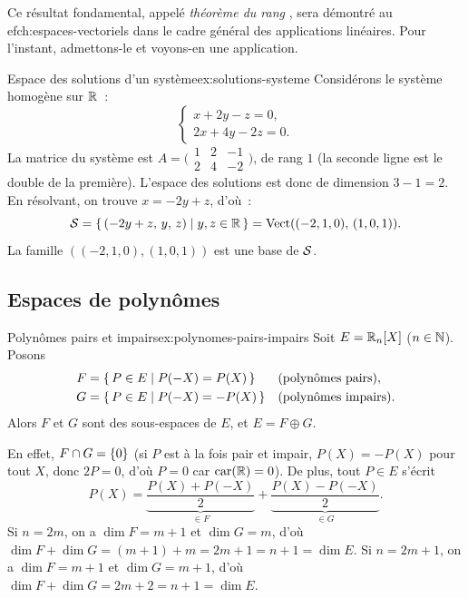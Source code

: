 Ce résultat fondamental, appelé \emph{théorème du rang}%
, sera démontré au 
ef{ch:espaces-vectoriels}
dans le cadre général des applications linéaires. Pour l'instant,
admettons-le et voyons-en une application.

\begin{example}{Espace des solutions d'un système}{ex:solutions-systeme}
  Considérons le système homogène sur ${\mathbb{R}}$~:
  \[
    \begin{cases}
      x+2y-z=0,\\
      2x+4y-2z=0.
    \end{cases}
  \]
  La matrice du système est
  $A=\bigl(\begin{smallmatrix}1&2&-1\\2&4&-2\end{smallmatrix}\bigr)$,
  de rang $1$ (la seconde ligne est le double de la première). L'espace
  des solutions est donc de dimension $3-1=2$. En résolvant, on trouve
  $x=-2y+z$, d'où~:
  \[
    {\mathcal{S}} = \left\{\,(-2y+z,\,y,\,z)\;\middle|\;y,z\in{\mathbb{R}}\,\right\}
    = \operatorname{Vect}((-2,1,0),\,(1,0,1)).
  \]
  La famille $((-2,1,0),(1,0,1))$ est une base de ${\mathcal{S}}$.
\end{example}

\subsection{Espaces de polynômes}\label{subsec:ev-polynomes}

\begin{example}{Polynômes pairs et impairs}{ex:polynomes-pairs-impairs}
  Soit $E={\mathbb{R}}_n[X]$ ($n\in{\mathbb{N}}$). Posons
  \begin{align*}
    F &= \left\{\,P\in E\;\middle|\;P(-X)=P(X)\,\right\} &&\text{(polynômes pairs)}, \\
    G &= \left\{\,P\in E\;\middle|\;P(-X)=-P(X)\,\right\} &&\text{(polynômes impairs)}.
  \end{align*}
  Alors $F$ et $G$ sont des sous-espaces de $E$, et $E=F\oplus G$.

  En effet, $F\cap G=\left\{0\right\}$ (si $P$ est à la fois pair et impair,
  $P(X)=-P(X)$ pour tout $X$, donc $2P=0$, d'où $P=0$ car
  $\operatorname{car}({\mathbb{R}})=0$). De plus, tout $P\in E$ s'écrit
  \[
    P(X) = \underbrace{\frac{P(X)+P(-X)}{2}}_{\in F}
    + \underbrace{\frac{P(X)-P(-X)}{2}}_{\in G}.
  \]
  Si $n=2m$, on a $\dim F=m+1$ et $\dim G=m$, d'où
  $\dim F+\dim G=(m+1)+m=2m+1=n+1=\dim E$.
  Si $n=2m+1$, on a $\dim F=m+1$ et $\dim G=m+1$, d'où
  $\dim F+\dim G=2m+2=n+1=\dim E$.
\end{example}

